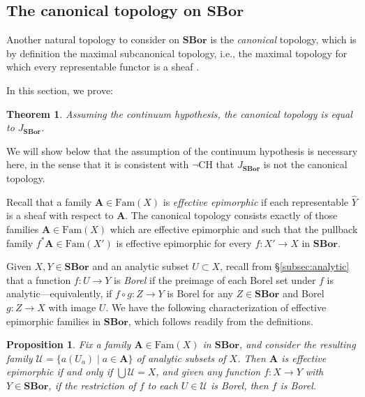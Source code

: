\documentclass[11pt]{amsart}
\newcommand\alttext{\texorpdfstring}
\newcommand\bA{\mathbf{A}}
\newcommand\cU{\mathcal{U}}
\newcommand\Fam{\mathrm{Fam}}
\newcommand\SBor{\mathbf{SBor}}
\newcommand\set[2][]{#1\{{#2}#1\}}
\newcommand\wh[1]{\widehat{#1}}
\theoremstyle{definition}
\theoremstyle{remark}
\theoremstyle{plain}
\newtheorem{propn}[defn]{Proposition}
\newtheorem{thm}[defn]{Theorem}
\begin{document}
\subsection{The canonical topology on \alttext{\( \SBor \)}{SBor}} \label{subsec:can-top}
Another natural topology to consider on \( \SBor \) is the \emph{canonical} topology, which is by definition the maximal subcanonical topology, i.e., the maximal topology for which every representable functor is a sheaf \cite[p.~15]{johnstone-topos-theory}.

In this section, we prove:
\begin{thm}\label{thm:canonical}
  Assuming the continuum hypothesis, the canonical topology is equal to \( J_{\SBor} \).
\end{thm}
We will show below that the assumption of the continuum hypothesis is necessary here, in the sense that it is consistent with \( \neg \mathrm{CH} \) that \( J_{\SBor} \) is not the canonical topology.

Recall that a family \( \bA \in \Fam(X) \) is \emph{effective epimorphic} if each representable \( \wh Y \) is a sheaf with respect to \( \bA \).
The canonical topology consists exactly of those families \( \bA \in \Fam(X) \) which are effective epimorphic and such that the pullback family \( f^* \bA \in \Fam(X') \) is effective epimorphic for every \( f \colon X' \to X \) in \( \SBor \).

Given \( X,Y \in \SBor \) and an analytic subset \( U \subset X \), recall from \S\ref{subsec:analytic} that a function \( f \colon U \to Y \) is \emph{Borel} if the preimage of each Borel set under \( f \) is analytic---equivalently, if \( f \circ g \colon Z \to Y \) is Borel for any \( Z \in \SBor \) and Borel \( g \colon Z \to X \) with image \( U \).
We have the following characterization of effective epimorphic families in \( \SBor \), which follows readily from the definitions.
\begin{propn}
  Fix a family \( \bA \in \Fam(X) \) in \( \SBor \), and consider the resulting family \( \cU = \set{a(U_a) \mid a \in \bA} \) of analytic subsets of \( X \).
  Then \( \bA \) is effective epimorphic if and only if \( \bigcup \cU = X \), and given any function \( f \colon X \to Y \) with \( Y \in \SBor \), if the restriction of \( f \) to each \( U \in \cU \) is Borel, then \( f \) is Borel.
\end{propn}
\end{document}
